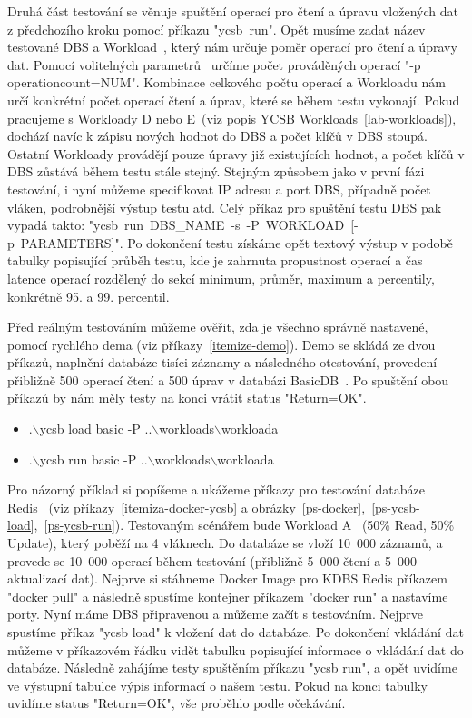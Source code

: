 \documentclass[czech,master,dept460,male,csharp,cpdeclaration]{diploma}
\begin{document}
	Druhá část testování se věnuje spuštění operací pro čtení a úpravu vložených dat z předchozího kroku pomocí příkazu "ycsb~run". Opět musíme zadat název testované DBS a Workload~\cite{workloads}, který nám určuje poměr operací pro čtení a úpravy dat. Pomocí volitelných parametrů~\cite{ycsb-properties} určíme počet prováděných operací "-p operationcount=NUM". Kombinace celkového počtu operací a Workloadu nám určí konkrétní počet operací čtení a úprav, které se během testu vykonají. Pokud pracujeme s Workloady D nebo E~(viz popis YCSB Workloads~\ref{lab-workloads}), dochází navíc k zápisu nových hodnot do DBS a počet klíčů v DBS stoupá. Ostatní Workloady provádějí pouze úpravy již existujících hodnot, a počet klíčů v DBS zůstává během testu stále stejný. Stejným způsobem jako v první fázi testování, i nyní můžeme specifikovat IP adresu a port DBS, případně počet vláken, podrobnější výstup testu atd. Celý příkaz pro spuštění testu DBS pak vypadá takto: "ycsb~run~DBS\_NAME~-s~-P~WORKLOAD~[-p~PARAMETERS]". Po dokončení testu získáme opět textový výstup v podobě tabulky popisující průběh testu, kde je zahrnuta propustnost operací a čas latence operací rozdělený do sekcí minimum, průměr, maximum a percentily, konkrétně 95. a 99. percentil.
	
	Před reálným testováním můžeme ověřit, zda je všechno správně nastavené, pomocí rychlého dema (viz příkazy~\ref{itemize-demo}). Demo se skládá ze dvou příkazů, naplnění databáze tisíci záznamy a následného otestování, provedení přibližně 500 operací čtení a 500 úprav v databázi BasicDB~\cite{basicdb}. Po spuštění obou příkazů by nám měly testy na konci vrátit status "Return=OK".
	
	\begin{itemize}\label{itemize-demo}
		\item .$\backslash$ycsb load basic -P ..$\backslash$workloads$\backslash$workloada
		\item .$\backslash$ycsb run basic -P ..$\backslash$workloads$\backslash$workloada
	\end{itemize}
	
	Pro názorný příklad si popíšeme a ukážeme příkazy pro testování databáze Redis~\cite{redis} (viz příkazy~\ref{itemiza-docker-ycsb} a obrázky~\ref{ps-docker},~\ref{ps-ycsb-load},~\ref{ps-ycsb-run}). Testovaným scénářem bude Workload A~\cite{workloads} (50\% Read, 50\% Update), který poběží na 4 vláknech. Do databáze se vloží 10~000 záznamů, a provede se 10~000 operací během testování (přibližně 5~000 čtení a 5~000 aktualizací dat). Nejprve si stáhneme Docker Image pro KDBS Redis příkazem "docker pull" a následně spustíme kontejner příkazem "docker run" a nastavíme porty. Nyní máme DBS připravenou a můžeme začít s testováním. Nejprve spustíme příkaz "ycsb load" k vložení dat do databáze. Po dokončení vkládání dat můžeme v příkazovém řádku vidět tabulku popisující informace o vkládání dat do databáze. Následně zahájíme testy spuštěním příkazu "ycsb run", a opět uvidíme ve výstupní tabulce výpis informací o našem testu. Pokud na konci tabulky uvidíme status "Return=OK", vše proběhlo podle očekávání.
	
\end{document}

